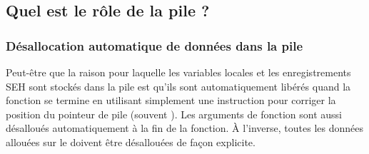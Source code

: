 
\subsection{Quel est le rôle de la pile ?}








\subsubsection{Désallocation automatique de données dans la pile}

Peut-être que la raison pour laquelle les variables locales et les enregistrements SEH sont stockés dans la
pile est qu'ils sont automatiquement libérés quand la fonction se termine en utilisant simplement une
instruction pour corriger la position du pointeur de pile (souvent \ADD).
Les arguments de fonction sont aussi désalloués automatiquement à la fin de la fonction.
À l'inverse, toutes les données allouées sur le  doivent être désallouées de façon explicite.




